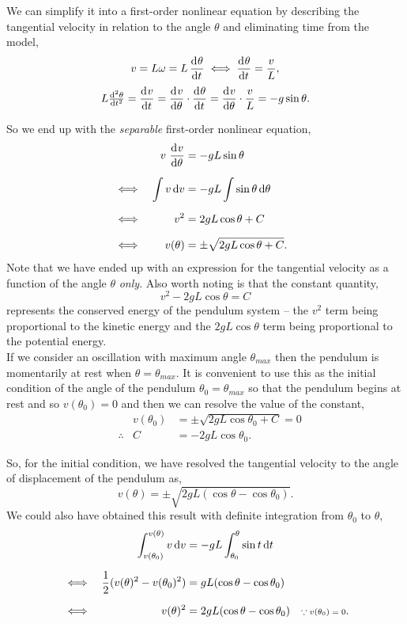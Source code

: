 \documentclass[../MathsNotesBase.tex]{subfiles}
\begin{document}
{\begin{exe}
{				We can simplify it into a first-order nonlinear equation by describing the tangential velocity in relation to the angle $\theta$ and eliminating time from the model,
				\[ v = L\omega = L\dod{\theta}{t} \iff \dod{\theta}{t} = \frac{v}{L}, \]
				\[ L \od[2]{\theta}{t} = \dod{v}{t} = \dod{v}{\theta} \cdot \dod{\theta}{t} = \dod{v}{\theta} \cdot \frac{v}{L} = - g \sin\theta. \]
				
				\bigskip
				So we end up with the \textit{separable} first-order nonlinear equation,
				\begin{align*}
					&& v \, \dod{v}{\theta} &= - gL \sin\theta \nn
					&\iff & \int v \dif v &= -gL \int \sin\theta \dif \theta &\sidecomment{} \nn
					&\iff & v^2 &= 2gL \cos\theta + C &\sidecomment{} \nn
					&\iff & v(\theta) &= \pm \sqrt{2gL \cos\theta + C}. \\
				\end{align*}
				Note that we have ended up with an expression for the tangential velocity as a function of the angle $\theta$ \textit{only}.  Also worth noting is that the constant quantity,
					\[ v^2 - 2gL \cos\theta = C \]
				represents the conserved energy of the pendulum system -- the $v^2$ term being proportional to the kinetic energy and the $2gL \cos\theta$ term being proportional to the potential energy.\\
				
				If we consider an oscillation with maximum angle $\theta_{max}$ then the pendulum is momentarily at rest when ${ \theta = \theta_{max} }$. It is convenient to use this as the initial condition of the angle of the pendulum ${ \theta_0 = \theta_{max} }$ so that the pendulum begins at rest and so ${ v(\theta_0) = 0 }$ and then we can resolve the value of the constant,
				\begin{align*}
					&& v(\theta_0) &= \pm \sqrt{2gL \cos\theta_0 + C} = 0 \\
					&\therefore & C &= - 2gL \cos\theta_0.
				\end{align*}
			
				So, for the initial condition,  we have resolved the tangential velocity \wrt to the angle of displacement of the pendulum as,
				\[ v(\theta) = \pm \sqrt{2gL (\cos\theta - \cos\theta_0)}. \]
				We could also have obtained this result with definite integration from $\theta_0$ to $\theta$,
				\begin{align*}
					&& \int_{v(\theta_0)}^{v(\theta)} v \dif v &= -gL \int_{\theta_0}^\theta \sin t \dif t \nn
					&\iff & \frac{1}{2} (v(\theta)^2 - v(\theta_0)^2) &= gL (\cos\theta - \cos\theta_0) &\sidecomment{} \nn
					&\iff & v(\theta)^2 &= 2gL (\cos\theta - \cos\theta_0) &\sidecomment{${ \because v(\theta_0) = 0 }$}. \\
				\end{align*}
			
}
\end{exe}}
\end{document}
